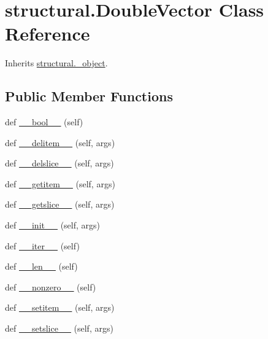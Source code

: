 \hypertarget{classstructural_1_1_double_vector}{}\section{structural.\+Double\+Vector Class Reference}
\label{classstructural_1_1_double_vector}


Inherits \hyperlink{classstructural_1_1__object}{structural.\+\_\+object}.

\subsection*{Public Member Functions}
\begin{DoxyCompactItemize}
\item 
def \hyperlink{classstructural_1_1_double_vector_a96689ff5e56c53c0dca26a8708a007b4}{\+\_\+\+\_\+bool\+\_\+\+\_\+} (self)
\item 
def \hyperlink{classstructural_1_1_double_vector_a0e0f21ff661d566a82527c7a9fe2b6a9}{\+\_\+\+\_\+delitem\+\_\+\+\_\+} (self, args)
\item 
def \hyperlink{classstructural_1_1_double_vector_a3b932fa7f2f34936675004b82f04b7bb}{\+\_\+\+\_\+delslice\+\_\+\+\_\+} (self, args)
\item 
def \hyperlink{classstructural_1_1_double_vector_a3228b179d9eb9774e86611c8a3be175a}{\+\_\+\+\_\+getitem\+\_\+\+\_\+} (self, args)
\item 
def \hyperlink{classstructural_1_1_double_vector_a721e454bec1a9c0174a224186cf37f54}{\+\_\+\+\_\+getslice\+\_\+\+\_\+} (self, args)
\item 
def \hyperlink{classstructural_1_1_double_vector_a20b69fa4a1e554c5fffff3d1dabbb3d6}{\+\_\+\+\_\+init\+\_\+\+\_\+} (self, args)
\item 
def \hyperlink{classstructural_1_1_double_vector_a240ab1c16636b6c2b2de3c5f22f23778}{\+\_\+\+\_\+iter\+\_\+\+\_\+} (self)
\item 
def \hyperlink{classstructural_1_1_double_vector_a56fbe4544479dd4c132a53b7f04b17b7}{\+\_\+\+\_\+len\+\_\+\+\_\+} (self)
\item 
def \hyperlink{classstructural_1_1_double_vector_aac4464b27233aa36f643b58e68288f31}{\+\_\+\+\_\+nonzero\+\_\+\+\_\+} (self)
\item 
def \hyperlink{classstructural_1_1_double_vector_a6336a0847b7a9c6eb93a85f91d2ad7f7}{\+\_\+\+\_\+setitem\+\_\+\+\_\+} (self, args)
\item 
def \hyperlink{classstructural_1_1_double_vector_ae652ae8950bfb7d90f0bfc4ad70399bb}{\+\_\+\+\_\+setslice\+\_\+\+\_\+} (self, args)

\end{DoxyCompactItemize}
